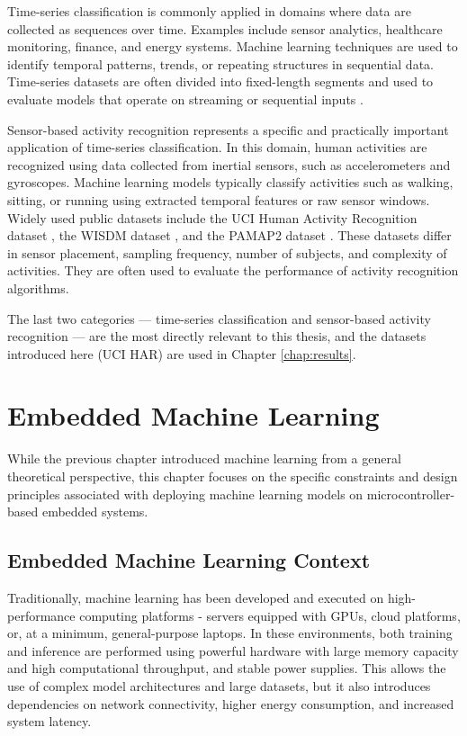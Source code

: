 Time-series classification is commonly applied in domains where data are collected as sequences over time. Examples include sensor analytics, healthcare monitoring, finance, and energy systems. Machine learning techniques are used to identify temporal patterns, trends, or repeating structures in sequential data. Time-series datasets are often divided into fixed-length segments and used to evaluate models that operate on streaming or sequential inputs \cite{fawaz2019tsc}.

Sensor-based activity recognition represents a specific and practically important application of time-series classification. In this domain, human activities are recognized using data collected from inertial sensors, such as accelerometers and gyroscopes. Machine learning models typically classify activities such as walking, sitting, or running using extracted temporal features or raw sensor windows. Widely used public datasets include the UCI Human Activity Recognition dataset \cite{anguita2013uci}, the WISDM dataset \cite{kwapisz2011wisdm}, and the PAMAP2 dataset \cite{reiss2012pamap2}. These datasets differ in sensor placement, sampling frequency, number of subjects, and complexity of activities. They are often used to evaluate the performance of activity recognition algorithms. 

The last two categories — time-series classification and sensor-based activity recognition — are the most directly relevant to this thesis, and the datasets introduced here (UCI HAR) are used in Chapter \ref{chap:results}.

\chapter{Embedded Machine Learning}
\label{chap:embedded}

While the previous chapter introduced machine learning from a general theoretical perspective, this chapter focuses on the specific constraints and design principles associated with deploying machine learning models on microcontroller-based embedded systems.

\section{Embedded Machine Learning Context}

Traditionally, machine learning has been developed and executed on high-performance computing platforms - servers equipped with GPUs, cloud platforms, or, at a minimum, general-purpose laptops. In these environments, both training and inference are performed using powerful hardware with large memory capacity and high computational throughput, and stable power supplies. This allows the use of complex model architectures and large datasets, but it also introduces dependencies on network connectivity, higher energy consumption, and increased system latency.

